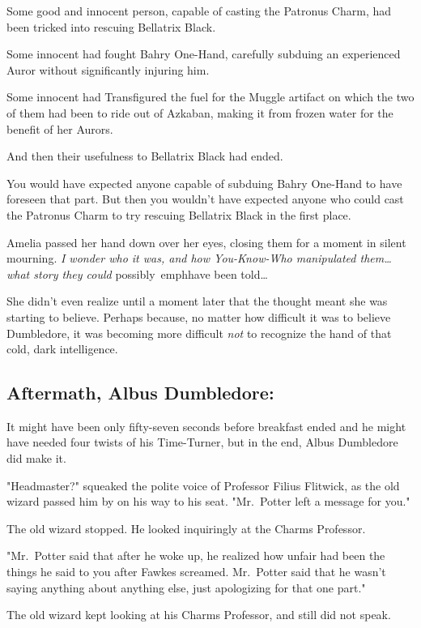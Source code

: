 Some good and innocent person, capable of casting the Patronus Charm, had been 
tricked into rescuing Bellatrix Black.

Some innocent had fought Bahry One-Hand, carefully subduing an experienced 
Auror without significantly injuring him.

Some innocent had Transfigured the fuel for the Muggle artifact on which the 
two of them had been to ride out of Azkaban, making it from frozen water for 
the benefit of her Aurors.

And then their usefulness to Bellatrix Black had ended.

You would have expected anyone capable of subduing Bahry One-Hand to have 
foreseen that part. But then you wouldn't have expected anyone who could cast 
the Patronus Charm to try rescuing Bellatrix Black in the first place.

Amelia passed her hand down over her eyes, closing them for a moment in silent 
mourning. \emph{I wonder who it was, and how You-Know-Who manipulated 
them{\ldots} what story they could} possibly\ emph{have been told{\ldots}}

She didn't even realize until a moment later that the thought meant she was 
starting to believe. Perhaps because, no matter how difficult it was to believe 
Dumbledore, it was becoming more difficult \emph{not} to recognize the hand of 
that cold, dark intelligence.
\sbreak
\subsection{Aftermath, Albus Dumbledore:}

It might have been only fifty-seven seconds before breakfast ended and he might 
have needed four twists of his Time-Turner, but in the end, Albus Dumbledore 
did make it.

"Headmaster?" squeaked the polite voice of Professor Filius Flitwick, as the 
old wizard passed him by on his way to his seat. "Mr.~Potter left a message for 
you."

The old wizard stopped. He looked inquiringly at the Charms Professor.

"Mr.~Potter said that after he woke up, he realized how unfair had been the 
things he said to you after Fawkes screamed. Mr.~Potter said that he wasn't 
saying anything about anything else, just apologizing for that one part."

The old wizard kept looking at his Charms Professor, and still did not speak.

